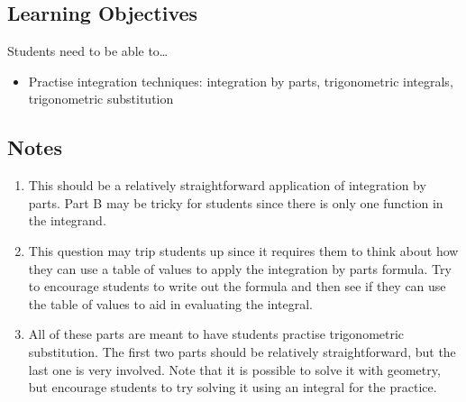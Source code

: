 \subsection*{Learning Objectives}
	Students need to be able to\ldots
	\begin{itemize}
		\item Practise integration techniques: integration by parts, trigonometric integrals, trigonometric substitution
	\end{itemize}

\subsection*{Notes}
	\begin{enumerate}
			\item This should be a relatively straightforward application of integration by parts. Part B may be tricky for students since there is only one function in the integrand.

            \item This question may trip students up since it requires them to think about how they can use a table of values to apply the integration by parts formula. Try to encourage students to write out the formula and then see if they can use the table of values to aid in evaluating the integral.

            \item All of these parts are meant to have students practise trigonometric substitution. The first two parts should be relatively straightforward, but the last one is very involved. Note that it is possible to solve it with geometry, but encourage students to try solving it using an integral for the practice.

	\end{enumerate}
